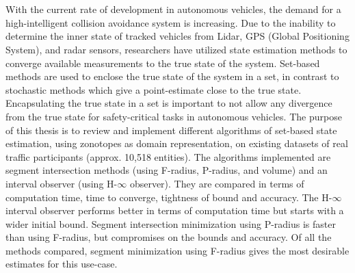 \chapter{\abstractname}
With the current rate of development in autonomous vehicles, the demand for a high-intelligent collision avoidance system is increasing. Due to the inability to determine the inner state of tracked vehicles from Lidar, GPS (Global Positioning System), and radar sensors, researchers have utilized state estimation methods to converge available measurements to the true state of the system. Set-based methods are used to enclose the true state of the system in a set, in contrast to stochastic methods which give a point-estimate close to the true state. Encapsulating the true state in a set is important to not allow any divergence from the true state for safety-critical tasks in autonomous vehicles. The purpose of this thesis is to review and implement different algorithms of set-based state estimation, using zonotopes as domain representation, on existing datasets of real traffic participants (approx. 10,518 entities). The algorithms implemented are segment intersection methods (using F-radius, P-radius, and volume) and an interval observer (using H-$\infty$ observer). They are compared in terms of computation time, time to converge, tightness of bound and accuracy. The H-$\infty$ interval observer performs better in terms of computation time but starts with a wider initial bound. Segment intersection minimization using P-radius is faster than using F-radius, but compromises on the bounds and accuracy. Of all the methods compared, segment minimization using F-radius gives the most desirable estimates for this use-case.